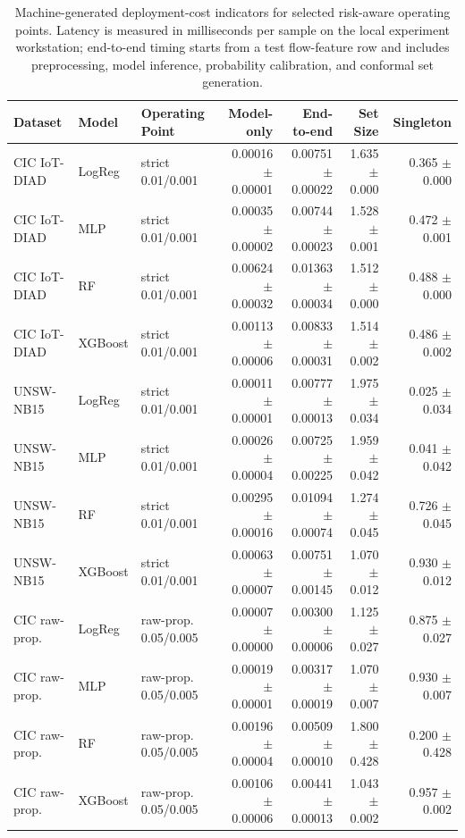 \begin{table}[t]
\centering
\scriptsize
\setlength{\tabcolsep}{3pt}
\begin{tabular}{@{}lllrrrr@{}}
\toprule
Dataset & Model & Operating Point & Model-only & End-to-end & Set Size & Singleton \\
\midrule
CIC IoT-DIAD & LogReg & strict 0.01/0.001 & 0.00016 $\pm$ 0.00001 & 0.00751 $\pm$ 0.00022 & 1.635 $\pm$ 0.000 & 0.365 $\pm$ 0.000 \\
CIC IoT-DIAD & MLP & strict 0.01/0.001 & 0.00035 $\pm$ 0.00002 & 0.00744 $\pm$ 0.00023 & 1.528 $\pm$ 0.001 & 0.472 $\pm$ 0.001 \\
CIC IoT-DIAD & RF & strict 0.01/0.001 & 0.00624 $\pm$ 0.00032 & 0.01363 $\pm$ 0.00034 & 1.512 $\pm$ 0.000 & 0.488 $\pm$ 0.000 \\
CIC IoT-DIAD & XGBoost & strict 0.01/0.001 & 0.00113 $\pm$ 0.00006 & 0.00833 $\pm$ 0.00031 & 1.514 $\pm$ 0.002 & 0.486 $\pm$ 0.002 \\
UNSW-NB15 & LogReg & strict 0.01/0.001 & 0.00011 $\pm$ 0.00001 & 0.00777 $\pm$ 0.00013 & 1.975 $\pm$ 0.034 & 0.025 $\pm$ 0.034 \\
UNSW-NB15 & MLP & strict 0.01/0.001 & 0.00026 $\pm$ 0.00004 & 0.00725 $\pm$ 0.00225 & 1.959 $\pm$ 0.042 & 0.041 $\pm$ 0.042 \\
UNSW-NB15 & RF & strict 0.01/0.001 & 0.00295 $\pm$ 0.00016 & 0.01094 $\pm$ 0.00074 & 1.274 $\pm$ 0.045 & 0.726 $\pm$ 0.045 \\
UNSW-NB15 & XGBoost & strict 0.01/0.001 & 0.00063 $\pm$ 0.00007 & 0.00751 $\pm$ 0.00145 & 1.070 $\pm$ 0.012 & 0.930 $\pm$ 0.012 \\
CIC raw-prop. & LogReg & raw-prop. 0.05/0.005 & 0.00007 $\pm$ 0.00000 & 0.00300 $\pm$ 0.00006 & 1.125 $\pm$ 0.027 & 0.875 $\pm$ 0.027 \\
CIC raw-prop. & MLP & raw-prop. 0.05/0.005 & 0.00019 $\pm$ 0.00001 & 0.00317 $\pm$ 0.00019 & 1.070 $\pm$ 0.007 & 0.930 $\pm$ 0.007 \\
CIC raw-prop. & RF & raw-prop. 0.05/0.005 & 0.00196 $\pm$ 0.00004 & 0.00509 $\pm$ 0.00010 & 1.800 $\pm$ 0.428 & 0.200 $\pm$ 0.428 \\
CIC raw-prop. & XGBoost & raw-prop. 0.05/0.005 & 0.00106 $\pm$ 0.00006 & 0.00441 $\pm$ 0.00013 & 1.043 $\pm$ 0.002 & 0.957 $\pm$ 0.002 \\
\bottomrule
\end{tabular}
\caption{Machine-generated deployment-cost indicators for selected risk-aware operating points. Latency is measured in milliseconds per sample on the local experiment workstation; end-to-end timing starts from a test flow-feature row and includes preprocessing, model inference, probability calibration, and conformal set generation.}
\label{tab:deployment-cost}
\end{table}
